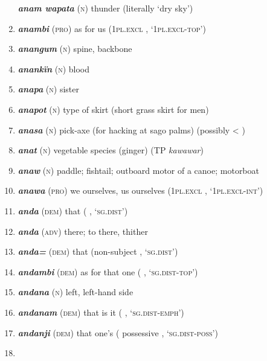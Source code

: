 \begin{enumerate}[noitemsep, label={}, align=left, widest=190, labelsep=1ex,leftmargin=*,itemindent=-10pt]
\textbf{\textit{anam wapata}} (\textsc{n}) thunder (literally ‘dry sky’) \item 
\textbf{\textit{anambi}} (\textsc{pro}) as for us (\textsc{1pl.excl} , ‘\textsc{1pl.excl-top}’) \item 
\textbf{\textit{anangum}} (\textsc{n}) spine, backbone \item 
\textbf{\textit{anankïn}} (\textsc{n}) blood \item 
\textbf{\textit{anapa}} (\textsc{n}) sister \item 
\textbf{\textit{anapot}} (\textsc{n}) type of skirt (short grass skirt for men) \item 
\textbf{\textit{anasa}} (\textsc{n}) pick-axe (for hacking at sago palms) (possibly < ) \item 
\textbf{\textit{anat}} (\textsc{n}) vegetable species (ginger) (TP \textit{kawawar}) \item 
\textbf{\textit{anaw}} (\textsc{n}) paddle; fishtail; outboard motor of a canoe; motorboat \item 
\textbf{\textit{anawa}} (\textsc{pro}) we ourselves, us ourselves (1\textsc{pl.excl} , \linebreak ‘\textsc{1pl.excl-int}’) \item 
\textbf{\textit{anda}} (\textsc{dem}) that (  , ‘\textsc{sg.dist}’) \item 
\textbf{\textit{anda}} (\textsc{adv}) there; to there, thither \item 
\textbf{\textit{anda=}} (\textsc{dem}) that (non-subject   , ‘\textsc{sg.dist}’) \item 
\textbf{\textit{andambi}} (\textsc{dem}) as for that one (   , \linebreak ‘\textsc{sg.dist-top}’) \item 
\textbf{\textit{andana}} (\textsc{n}) left, left-hand side \item 
\textbf{\textit{andanam}} (\textsc{dem}) that is it (   , \linebreak‘\textsc{sg.dist-emph}’) \item 
\textbf{\textit{andanji}} (\textsc{dem}) that one’s (  possessive , \linebreak‘\textsc{sg.dist-poss}’) \item 

\end{enumerate}
